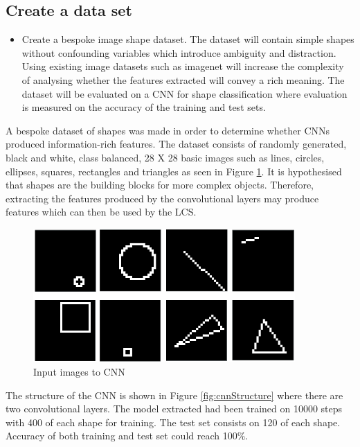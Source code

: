 \subsection{Create a data set}
\begin{itemize}
	\item Create a bespoke image shape dataset. The dataset will contain simple shapes without confounding variables which introduce ambiguity and distraction. Using existing image datasets such as imagenet \cite{imagenet} will increase the complexity of analysing whether the features extracted will convey a rich meaning. The dataset will be evaluated on a CNN for shape classification where evaluation is measured on the accuracy of the training and test sets.
	
\end{itemize}
A bespoke dataset of shapes was made in order to determine whether CNNs produced information-rich features. The dataset consists of randomly generated, black and white, class balanced, 28 X 28 basic images such as lines, circles, ellipses, squares, rectangles and triangles as seen in Figure \ref{fig:inputShapes}. It is hypothesised that shapes are the building blocks for more complex objects. Therefore, extracting the features produced by the convolutional layers may produce features which can then be used by the LCS. 
\begin{figure}[H]
	\begin{center}
		\includegraphics[width=100mm, scale=0.9]{inputShapes.png}
		\caption{Input images to CNN}
		\label{fig:inputShapes}
	\end{center}
	
\end{figure}
The structure of the CNN is shown in Figure \ref{fig:cnnStructure} where there are two convolutional layers. The model extracted had been trained on 10000 steps with 400 of each shape for training. The test set consists on 120 of each shape. Accuracy of both training and test set could reach 100\%. 

